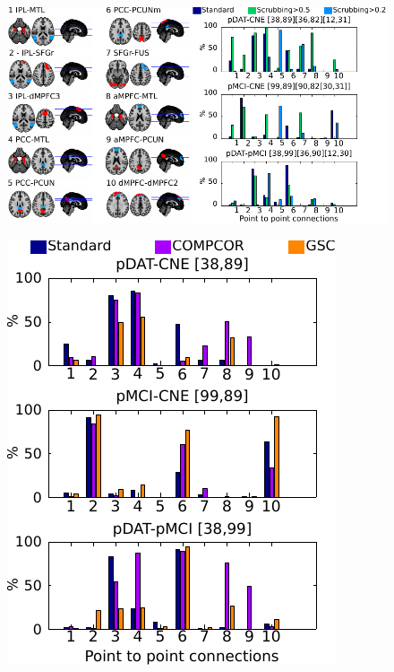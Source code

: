 \documentclass[authoryear]{elsarticle}
\begin{document}
\begin{figure}[tbp]
\begin{center}
\includegraphics[width=\linewidth]{../figures/p2pdetection.pdf}
\end{center}
\caption{
}
\label{fig_p2p}
\end{figure}


\begin{figure}[tbp]
\begin{center}
\includegraphics[width=\linewidth]{../figures/p2pdetection_gsc_compcor.pdf}
\end{center}
\caption{
}
\label{fig_p2p_compcor_gsc}
\end{figure}
\end{document}
